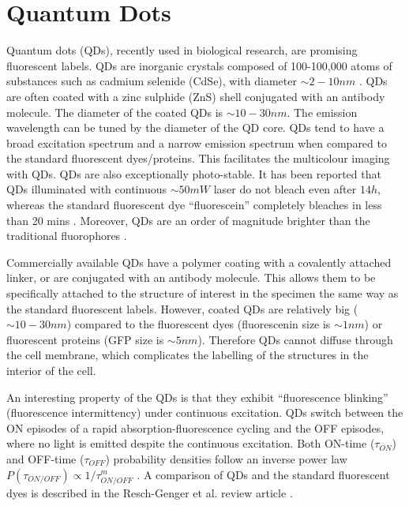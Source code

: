 
\section{Quantum Dots\label{sec:Quantum-dots}}

Quantum dots (QDs), recently used in biological research, are promising fluorescent labels.  QDs are inorganic crystals composed of 100-100,000 atoms of substances such as cadmium selenide (CdSe), with diameter $\sim2-10\unit{nm}$ \cite{Alivisatos1996}. QDs are often coated with a zinc sulphide (ZnS) shell conjugated with an antibody molecule. The diameter of the coated QDs is $\sim10-30\unit{nm}$. The emission wavelength can be tuned by the diameter of the QD core. QDs tend to have a broad excitation spectrum and a narrow emission spectrum when compared to the standard fluorescent dyes/proteins. This facilitates the multicolour imaging with QDs. QDs are also exceptionally photo-stable. It has been reported that QDs illuminated with continuous $\sim 50\unit{mW}$ laser do not bleach even after $14\unit{h}$, whereas the standard fluorescent dye ``fluorescein'' completely bleaches in less than 20 mins \cite{Jaiswal2004}. Moreover, QDs are an order of magnitude brighter than the traditional fluorophores \cite{Resch-Genger2008,Walling2009}. 

Commercially available QDs have a polymer coating with a covalently attached linker, or are conjugated with an antibody molecule. This allows them to be specifically attached to the structure of interest in the specimen the same way as the standard fluorescent labels. However, coated QDs are relatively big ($\sim10-30\unit{nm}$) compared to the fluorescent dyes (fluorescenin size is $\sim1\unit{nm}$) or fluorescent proteins (GFP size is $\sim5\unit{nm}$). Therefore QDs cannot diffuse through the cell membrane, which complicates the labelling of the structures in the interior of the cell. 

An interesting property of the QDs is that they exhibit ``fluorescence blinking'' (fluorescence intermittency) under continuous excitation. QDs switch between the ON episodes of a rapid absorption-fluorescence cycling and the OFF episodes, where no light is emitted despite the continuous excitation. Both ON-time ($\tau_{ON}$) and OFF-time ($\tau_{OFF}$) probability densities follow an inverse power law $P(\tau_{ON/OFF})\propto1/\tau_{ON/OFF}^{m}$ \cite{Kuno2001, Stefani2009}. A comparison of QDs and the standard fluorescent dyes is described in the Resch-Genger et al. review article \cite{Resch-Genger2008}.

